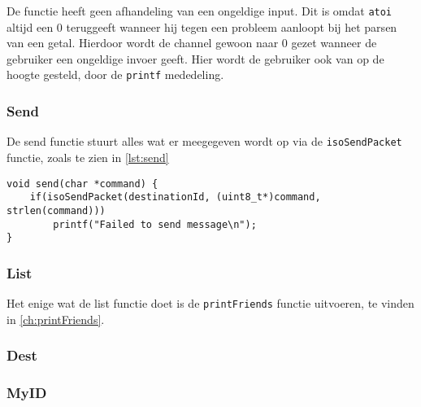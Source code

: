De functie heeft geen afhandeling van een ongeldige input. Dit is omdat \texttt{atoi} altijd een 0 teruggeeft wanneer hij tegen een probleem aanloopt bij het parsen van een getal. Hierdoor wordt de channel gewoon naar 0 gezet wanneer de gebruiker een ongeldige invoer geeft. Hier wordt de gebruiker ook van op de hoogte gesteld, door de \texttt{printf} mededeling.


\subsubsection{Send}
De send functie stuurt alles wat er meegegeven wordt op via de \texttt{isoSendPacket} functie, zoals te zien in \autoref{lst:send}
\begin{lstlisting}[caption={De send functie},captionpos=b,label={lst:send},style=c,xleftmargin=.\textwidth,xrightmargin=.\textwidth]
void send(char *command) {
    if(isoSendPacket(destinationId, (uint8_t*)command, strlen(command))) 
        printf("Failed to send message\n");    
}
\end{lstlisting}

\subsubsection{List}
Het enige wat de list functie doet is de \texttt{printFriends} functie uitvoeren, te vinden in \autoref{ch:printFriends}.

\subsubsection{Dest}


\subsubsection{MyID}

